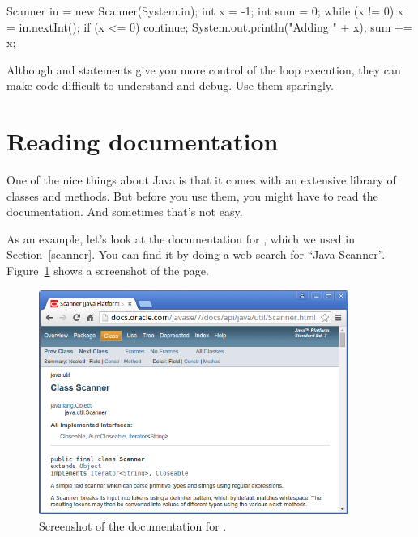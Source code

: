 \begin{code}
Scanner in = new Scanner(System.in);
int x = -1;
int sum = 0;
while (x != 0) {
    x = in.nextInt();
    if (x <= 0) {
        continue;
    }
    System.out.println("Adding " + x);
    sum += x;
}
\end{code}

Although  and  statements give you more control of the loop execution, they can make code difficult to understand and debug.
Use them sparingly.


\section{Reading documentation}
\label{sec:apidocs}


One of the nice things about Java is that it comes with an extensive library of classes and methods.
But before you use them, you might have to read the documentation.
And sometimes that's not easy.

As an example, let's look at the documentation for , which we used in Section~\ref{scanner}.
You can find it by doing a web search for ``Java Scanner''.
Figure~\ref{fig.scanner} shows a screenshot of the page.

\begin{figure}[!ht]
\begin{center}
\includegraphics[width=0.9\textwidth]{figs/scanner.png}
\caption{Screenshot of the documentation for .}
\label{fig.scanner}
\end{center}
\end{figure}

